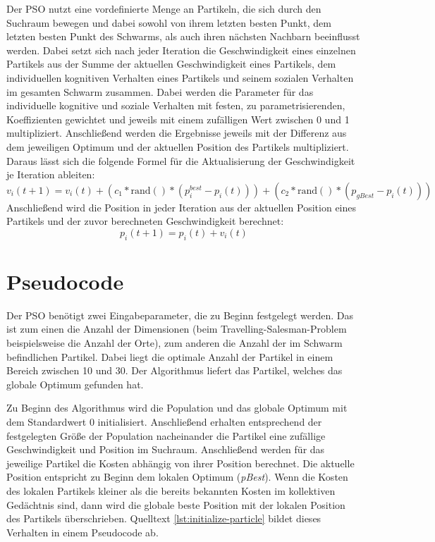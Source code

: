 Der PSO nutzt eine vordefinierte Menge an Partikeln, die sich durch den
Suchraum bewegen und dabei sowohl von ihrem letzten besten Punkt, dem letzten
besten Punkt des Schwarms, als auch ihren nächsten Nachbarn beeinflusst werden.
Dabei setzt sich nach jeder Iteration die Geschwindigkeit eines einzelnen
Partikels aus der Summe der aktuellen Geschwindigkeit eines Partikels, dem
individuellen kognitiven Verhalten eines Partikels und seinem sozialen
Verhalten im gesamten Schwarm zusammen. Dabei werden die Parameter für das
individuelle kognitive und soziale Verhalten mit festen, zu parametrisierenden,
Koeffizienten gewichtet und jeweils mit einem zufälligen Wert zwischen 0 und 1
multipliziert. Anschließend werden die Ergebnisse jeweils mit der Differenz
aus dem jeweiligen Optimum und der aktuellen Position des Partikels
multipliziert. Daraus lässt sich die folgende Formel für die Aktualisierung
der Geschwindigkeit je Iteration ableiten:
\begin{equation}
    v_i(t+1) = v_i(t) + (c_1 * \mathrm{rand()} * (p_{i}^{best} - p_i(t))) +
        (c_2 * \mathrm{rand()} * (p_{gBest} - p_i(t)))
\end{equation}
Anschließend wird die Position in jeder Iteration aus der aktuellen Position
eines Partikels und der zuvor berechneten Geschwindigkeit berechnet:
\begin{equation}
    p_i(t+1) = p_i(t) + v_i(t)
\end{equation}

\section{Pseudocode}

Der PSO benötigt zwei Eingabeparameter, die zu Beginn festgelegt werden. Das
ist zum einen die Anzahl der Dimensionen (beim Travelling-Salesman-Problem
beispielsweise die Anzahl der Orte), zum anderen die Anzahl der im Schwarm
befindlichen Partikel. Dabei liegt die optimale Anzahl der Partikel in einem
Bereich zwischen 10 und 30. Der Algorithmus liefert das Partikel, welches das
globale Optimum gefunden hat.

Zu Beginn des Algorithmus wird die Population und das globale Optimum mit dem
Standardwert 0 initialisiert. Anschließend erhalten entsprechend der
festgelegten Größe der Population nacheinander die Partikel eine zufällige
Geschwindigkeit und Position im Suchraum. Anschließend werden für das jeweilige
Partikel die Kosten abhängig von ihrer Position berechnet. Die aktuelle
Position entspricht zu Beginn dem lokalen Optimum (\emph{pBest}). Wenn die
Kosten des lokalen Partikels kleiner als die bereits bekannten Kosten im
kollektiven Gedächtnis sind, dann wird die globale beste Position mit der
lokalen Position des Partikels überschrieben. Quelltext
\ref{lst:initialize-particle} bildet dieses Verhalten in einem Pseudocode ab.

